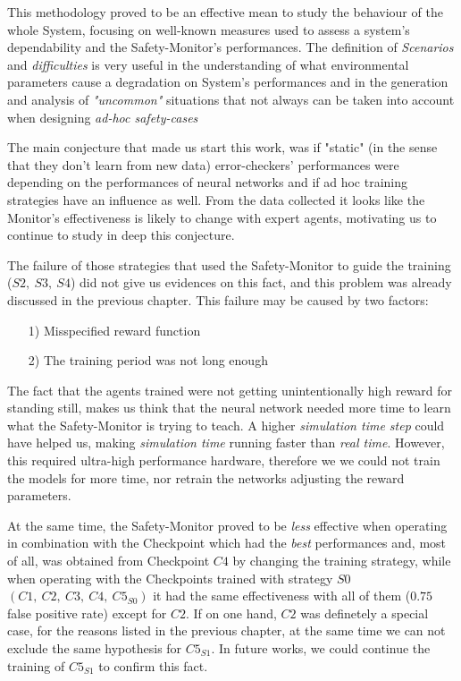This methodology proved to be an effective mean to study the behaviour of the whole System, focusing on well-known measures used to assess a system's dependability and the Safety-Monitor's performances. The definition of \textsl{Scenarios} and \textsl{difficulties} is very useful in the understanding of what environmental parameters cause a degradation on System's performances and in the generation and analysis of \textsl{"uncommon"} situations that not always can be taken into account when designing \textsl{ad-hoc safety-cases}
\newline

The main conjecture that made us start this work, was if "static" (in the sense that they don't learn from new data) error-checkers' performances were depending on the performances of neural networks and if ad hoc training strategies have an influence as well. From the data collected it looks like the Monitor's effectiveness is likely to change with expert agents, motivating us to continue to study in deep this conjecture.

The failure of those strategies that used the Safety-Monitor to guide the training ($S2,\: S3,\: S4$) did not give us evidences on this fact, and this problem was already discussed in the previous chapter. This failure may be caused by two factors:

\begin{itemize}
	\item[1)] Misspecified reward function
	\item[2)] The training period was not long enough
\end{itemize}

The fact that the agents trained were not getting unintentionally high reward for standing still, makes us think that the neural network needed more time to learn what the Safety-Monitor is trying to teach. A higher \textsl{simulation time step} could have helped us, making \textsl{simulation time} running faster than \textsl{real time}. However, this required ultra-high performance hardware, therefore we we could not train the models for more time, nor retrain the networks adjusting the reward parameters.

At the same time, the Safety-Monitor proved to be \textsl{less} effective when operating in combination with the Checkpoint which had the \textsl{best} performances and, most of all, was obtained from Checkpoint $C4$ by changing the training strategy, while when operating with the Checkpoints trained with strategy $S0$ $(C1,\: C2,\: C3,\: C4,\: C5_{S0})$ it had the same effectiveness with all of them ($0.75$ false positive rate) except for $C2$. If on one hand, $C2$ was definetely a special case, for the reasons listed in the previous chapter, at the same time we can not exclude the same hypothesis for $C5_{S1}$. In future works, we could continue the training of $C5_{S1}$ to confirm this fact.\newline\newline

